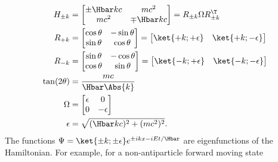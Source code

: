 \begin{equation}\label{eqn:gradQuantumProblemSet4Problem3:520}
\begin{aligned}
H_{\pm k} &=
\begin{bmatrix}
\pm \Hbar k c & m c^2 \\
m c^2 & \mp \Hbar k c
\end{bmatrix}
=
R_{\pm k} \Omega R_{\pm k}^\T \\
R_{+ k} &=
\begin{bmatrix}
\cos\theta & -\sin\theta  \\
\sin\theta & \cos\theta
\end{bmatrix}
=
\begin{bmatrix}
\ket{+k;+\epsilon} &
\ket{+k;-\epsilon}
\end{bmatrix}
\\
R_{- k} &=
\begin{bmatrix}
\sin\theta & -\cos\theta  \\
\cos\theta & \sin\theta
\end{bmatrix}
=
\begin{bmatrix}
\ket{-k;+\epsilon} &
\ket{-k;-\epsilon}
\end{bmatrix}
\\
\tan(2 \theta) &= \frac{m c}{\Hbar \Abs{k}} \\
\Omega &=
\begin{bmatrix}
\epsilon & 0 \\
0 & -\epsilon
\end{bmatrix} \\
\epsilon &= \sqrt{(\Hbar k c)^2 + (m c^2)^2}.
\end{aligned}
\end{equation}
%
The functions \( \Psi = \ket{\pm k; \pm \epsilon} e^{\pm i k x - i E t/\Hbar} \) are eigenfunctions of the Hamiltonian.  For example, for a non-antiparticle forward moving state
%
